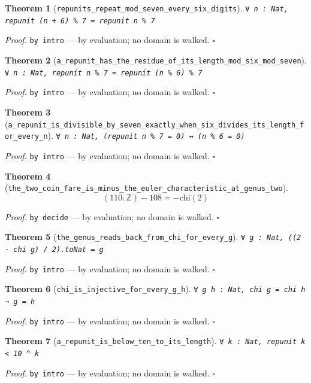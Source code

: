 \documentclass[11pt]{article}
\newtheorem{theorem}{Theorem}[section]
\begin{document}
\begin{theorem}[\texttt{repunits\_repeat\_mod\_seven\_every\_six\_digits}]
\texttt{∀ n : Nat, repunit (n + 6) \% 7 = repunit n \% 7}
\end{theorem}
\noindent\emph{Proof.} \texttt{by
  intro} --- by evaluation; no domain is walked. \hfill$\square$

\begin{theorem}[\texttt{a\_repunit\_has\_the\_residue\_of\_its\_length\_mod\_six\_mod\_seven}]
\texttt{∀ n : Nat, repunit n \% 7 = repunit (n \% 6) \% 7}
\end{theorem}
\noindent\emph{Proof.} \texttt{by
  intro} --- by evaluation; no domain is walked. \hfill$\square$

\begin{theorem}[\texttt{a\_repunit\_is\_divisible\_by\_seven\_exactly\_when\_six\_divides\_its\_length\_for\_every\_n}]
\texttt{∀ n : Nat, (repunit n \% 7 = 0) ↔ (n \% 6 = 0)}
\end{theorem}
\noindent\emph{Proof.} \texttt{by
  intro} --- by evaluation; no domain is walked. \hfill$\square$

\begin{theorem}[\texttt{the\_two\_coin\_fare\_is\_minus\_the\_euler\_characteristic\_at\_genus\_two}]
\[ \left(110 : \mathbb{Z}\right) - 108 = -\mathrm{chi}\mathopen{}\left(2\right) \]
\end{theorem}
\noindent\emph{Proof.} \texttt{by decide} --- by evaluation; no domain is walked. \hfill$\square$

\begin{theorem}[\texttt{the\_genus\_reads\_back\_from\_chi\_for\_every\_g}]
\texttt{∀ g : Nat, ((2 - chi g) / 2).toNat = g}
\end{theorem}
\noindent\emph{Proof.} \texttt{by
  intro} --- by evaluation; no domain is walked. \hfill$\square$

\begin{theorem}[\texttt{chi\_is\_injective\_for\_every\_g\_h}]
\texttt{∀ g h : Nat, chi g = chi h → g = h}
\end{theorem}
\noindent\emph{Proof.} \texttt{by
  intro} --- by evaluation; no domain is walked. \hfill$\square$

\begin{theorem}[\texttt{a\_repunit\_is\_below\_ten\_to\_its\_length}]
\texttt{∀ k : Nat, repunit k < 10 ^ k}
\end{theorem}
\noindent\emph{Proof.} \texttt{by
  intro} --- by evaluation; no domain is walked. \hfill$\square$
\end{document}
